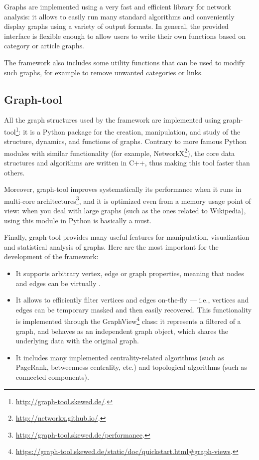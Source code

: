        Graphs are implemented using a very fast and efficient library for network analysis: it allows to easily run many standard algorithms and conveniently display graphs using a variety of output formats. In general, the provided interface is flexible enough to allow users to write their own functions based on category or article graphs.
        
        The framework also includes some utility functions that can be used to modify such graphs, for example to remove unwanted categories or links.
        \subsection{Graph-tool}
            All the graph structures used by the framework are implemented using graph-tool\footnote{\url{http://graph-tool.skewed.de/}.}: it is a Python package for the creation, manipulation, and study of the structure, dynamics, and functions of graphs. Contrary to more famous Python modules with similar functionality (for example, NetworkX\footnote{\url{http://networkx.github.io/}.}), the core data structures and algorithms are written in C++, thus making this tool faster than others.
            
            Moreover, graph-tool improves systematically its performance when it runs in multi-core architectures\footnote{\url{http://graph-tool.skewed.de/performance}.}, and it is optimized even from a memory usage point of view: when you deal with large graphs (such as the ones related to Wikipedia), using this module in Python is basically a must.
            
            Finally, graph-tool provides many useful features for manipulation, visualization and statistical analysis of graphs. Here are the most important for the development of the framework:
            \begin{itemize}
                \item It supports arbitrary vertex, edge or graph properties, meaning that nodes and edges can be virtually .
                \item It allows to efficiently filter vertices and edges on-the-fly --- i.e., vertices and edges can be temporary masked and then easily recovered. This functionality is implemented through the GraphView\footnote{\url{https://graph-tool.skewed.de/static/doc/quickstart.html\#graph-views}.} class: it represents a filtered  of a graph, and behaves as an independent graph object, which shares the underlying data with the original graph.
                \item It includes many implemented centrality-related algorithms (such as PageRank, betweenness centrality, etc.) and topological algorithms (such as connected components).
            \end{itemize}
